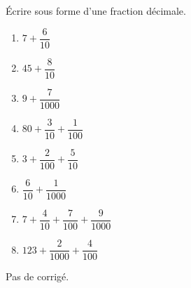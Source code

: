 \begin{exercice*}
    Écrire sous forme d'une fraction décimale. \smallskip
    \begin{multicols}{2}
      \begin{enumerate}
         \item $7+\dfrac{6}{10}$ \smallskip
         \item $45+\dfrac{8}{10}$ \smallskip
         \item $9+\dfrac{7}{\num{1 000}}$ \smallskip
         \item $80+\dfrac{3}{10}+\dfrac{1}{100}$ \smallskip
         \item $3+\dfrac{2}{100}+\dfrac{5}{10}$ \smallskip
         \item $\dfrac{6}{10}+\dfrac{1}{\num{1 000}}$ \smallskip
         \item $7+\dfrac{4}{10}+\dfrac{7}{100}+\dfrac{9}{\num{1 000}}$ \smallskip
         \item $123+\dfrac{2}{\num{1 000}}+\dfrac{4}{100}$
      \end{enumerate}
   \end{multicols}
 \end{exercice*}
\begin{corrige}
  Pas de corrigé.
\end{corrige}